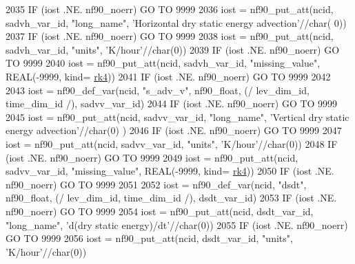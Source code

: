 \begin{DoxyCode}
2035     \textcolor{keywordflow}{IF} (iost .NE. nf90\_noerr) \textcolor{keywordflow}{GO TO} 9999
2036     iost    = nf90\_put\_att(ncid, sadvh\_var\_id, \textcolor{stringliteral}{"long\_name"}, \textcolor{stringliteral}{'Horizontal dry static energy advection'}//char(
      0))
2037     \textcolor{keywordflow}{IF} (iost .NE. nf90\_noerr) \textcolor{keywordflow}{GO TO} 9999
2038     iost    = nf90\_put\_att(ncid, sadvh\_var\_id, \textcolor{stringliteral}{"units"}, \textcolor{stringliteral}{'K/hour'}//char(0))
2039     \textcolor{keywordflow}{IF} (iost .NE. nf90\_noerr) \textcolor{keywordflow}{GO TO} 9999
2040     iost    = nf90\_put\_att(ncid, sadvh\_var\_id, \textcolor{stringliteral}{"missing\_value"}, \textcolor{keywordtype}{REAL}(-9999, kind=
      \hyperlink{namespaceportable_abaed22a509442771d3fba69bebda0b33}{rk4}))
2041     \textcolor{keywordflow}{IF} (iost .NE. nf90\_noerr) \textcolor{keywordflow}{GO TO} 9999
2042 
2043     iost    = nf90\_def\_var(ncid, \textcolor{stringliteral}{"s\_adv\_v"}, nf90\_float, (/ lev\_dim\_id, time\_dim\_id /), sadvv\_var\_id)
2044     \textcolor{keywordflow}{IF} (iost .NE. nf90\_noerr) \textcolor{keywordflow}{GO TO} 9999
2045     iost    = nf90\_put\_att(ncid, sadvv\_var\_id, \textcolor{stringliteral}{"long\_name"}, \textcolor{stringliteral}{'Vertical dry static energy advection'}//char(0)
      )
2046     \textcolor{keywordflow}{IF} (iost .NE. nf90\_noerr) \textcolor{keywordflow}{GO TO} 9999
2047     iost    = nf90\_put\_att(ncid, sadvv\_var\_id, \textcolor{stringliteral}{"units"}, \textcolor{stringliteral}{'K/hour'}//char(0))
2048     \textcolor{keywordflow}{IF} (iost .NE. nf90\_noerr) \textcolor{keywordflow}{GO TO} 9999
2049     iost    = nf90\_put\_att(ncid, sadvv\_var\_id, \textcolor{stringliteral}{"missing\_value"}, \textcolor{keywordtype}{REAL}(-9999, kind=
      \hyperlink{namespaceportable_abaed22a509442771d3fba69bebda0b33}{rk4}))
2050     \textcolor{keywordflow}{IF} (iost .NE. nf90\_noerr) \textcolor{keywordflow}{GO TO} 9999
2051 
2052     iost    = nf90\_def\_var(ncid, \textcolor{stringliteral}{"dsdt"}, nf90\_float, (/ lev\_dim\_id, time\_dim\_id /), dsdt\_var\_id)
2053     \textcolor{keywordflow}{IF} (iost .NE. nf90\_noerr) \textcolor{keywordflow}{GO TO} 9999
2054     iost    = nf90\_put\_att(ncid, dsdt\_var\_id, \textcolor{stringliteral}{"long\_name"}, \textcolor{stringliteral}{'d(dry static energy)/dt'}//char(0))
2055     \textcolor{keywordflow}{IF} (iost .NE. nf90\_noerr) \textcolor{keywordflow}{GO TO} 9999
2056     iost    = nf90\_put\_att(ncid, dsdt\_var\_id, \textcolor{stringliteral}{"units"}, \textcolor{stringliteral}{'K/hour'}//char(0))

\end{DoxyCode}
